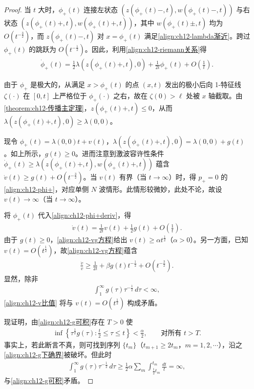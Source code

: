 \documentclass[../../main.tex]{subfiles}
\begin{document}
\begin{proof}
当 $t$ 大时，$\phi_+(t)$ 连接左状态 $(z(\phi_+(t)-,t),w(\phi_+(t)-,t))$ 与右状态 $(z(\phi_+(t)+,t),w(\phi_+(t)+,t))$，其中 $w(\phi_+(t)\pm,t)$ 均为 $O(t^{-\frac32})$，而 $z(\phi_+(t)-,t)$ 对 $x=\phi_+(t)$ 满足\eqref{align:ch12-lambda渐近}。跨过 $\phi_+(t)$ 的跳跃为 $O(t^{-\frac12})$。因此，利用\eqref{align:ch12-riemann关系}得
\begin{align}
\dot\phi_+(t)=\frac12\lambda(z(\phi_+(t)+,t),0)+\frac{1}{2t}\phi_+(t)+O\left(\frac1t\right).
\label{align:ch12-phi+deriv}
\end{align}

由于 $\phi_+$ 是极大的，从满足 $x>\phi_+(t)$ 的点 $(x,t)$ 发出的极小后向 1-特征线 $\zeta(\cdot)$ 在 $[0,t]$ 上严格位于 $\phi_+(\cdot)$ 之右，故在 $\zeta(0)>\ell$ 处被 $x$ 轴截取。由\cref{theorem:ch12-传播主定理}，$z(\phi_+(t)+,t)\leqslant0$，从而 $\lambda(z(\phi_+(t)+,t),0)\geqslant\lambda(0,0)$。

现令 $\phi_+(t)=\lambda(0,0)t+v(t)$，$\lambda(z(\phi_+(t)+,t),0)=\lambda(0,0)+g(t)$。如上所示，$g(t)\geqslant0$。进而注意到激波容许性条件 $\dot\phi_+(t)\geqslant\lambda(z(\phi_+(t)+,t),w(\phi_+(t)+,t))$ 蕴含 $\dot v(t)\geqslant g(t)+O(t^{-\frac32})$。当 $v(t)$ 有界（当 $t\to\infty$）时，得 $p_+=0$ 的\eqref{align:ch12-phi+}，对应单侧 $N$ 波情形。此情形较微妙，此处不论，故设 $v(t)\to\infty$（当 $t\to\infty$）。

将 $\phi_+(t)$ 代入\eqref{align:ch12-phi+deriv}，得
\begin{align}
\dot v(t)=\frac{1}{2t}v(t)+\frac12g(t)+O\left(\frac1t\right).
\label{align:ch12-vg方程}
\end{align}
由于 $g(t)\geqslant0$，\eqref{align:ch12-vg方程}给出 $v(t)\geqslant\alpha t^{\frac12}$（$\alpha>0$）。另一方面，已知 $v(t)=O(t^{\frac12})$，故\eqref{align:ch12-vg方程}蕴含
\begin{align}
\frac{\dot v}{v}\geqslant\frac{1}{2t}+\beta g(t)t^{-\frac12}+O(t^{-\frac32}).
\label{align:ch12-v比值}
\end{align}
显然，除非
\begin{align}
\int_1^\infty g(\tau)\tau^{-\frac12}\,d\tau<\infty,
\label{align:ch12-g可积}
\end{align}
\eqref{align:ch12-v比值} 将与 $v(t)=O(t^{\frac12})$ 构成矛盾。

现证明，由\eqref{align:ch12-g可积}存在 $T>0$ 使
\begin{align}
\inf\left\{\tau^{\frac12}g(\tau):\frac{t}{2}\leqslant\tau\leqslant t\right\}<\frac{\alpha}{2},\qquad\text{对所有 }t>T.
\label{align:ch12-g下确界}
\end{align}
事实上，若此断言不真，则可找到序列 $\{t_m\}$（$t_{m+1}\geqslant2t_m$，$m=1,2,\cdots$），沿之\eqref{align:ch12-g下确界}被破坏。但此时
\begin{align}
\int_1^\infty g(\tau)\tau^{-\frac12}\,d\tau\geqslant\frac12\alpha\sum_m\int_{\frac12t_m}^{t_m}\frac{dt}{t}=\infty,
\label{align:ch12-g发散}
\end{align}
与\eqref{align:ch12-g可积}矛盾。


\end{proof}
\end{document}
